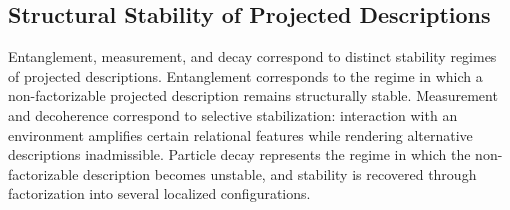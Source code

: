 \subsection{Structural Stability of Projected Descriptions}
  \label{subsec:noninjective-projection-entanglement}

  Entanglement, measurement, and decay correspond to distinct stability
  regimes of projected descriptions.
  Entanglement corresponds to the regime in which a non-factorizable
  projected description remains structurally stable.
  Measurement and decoherence correspond to selective stabilization:
  interaction with an environment amplifies certain relational features
  while rendering alternative descriptions inadmissible.
  Particle decay represents the regime in which the non-factorizable
  description becomes unstable, and stability is recovered through
  factorization into several localized configurations.

